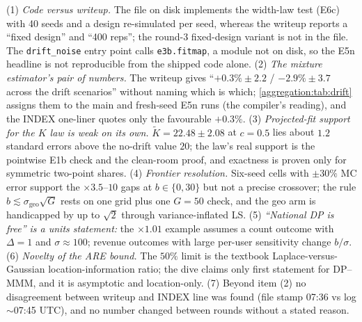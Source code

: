 \begin{reviewernote}[(compiler)]
(1) \emph{Code versus writeup.} The file on disk implements the width-law test (E6c) with 40 seeds and a design re-simulated per seed, whereas the writeup reports a ``fixed design'' and ``400 reps''; the round-3 fixed-design variant is not in the file. The \texttt{drift\_noise} entry point calls \texttt{e3b.fitmap}, a module not on disk, so the E5n headline is not reproducible from the shipped code alone. (2) \emph{The mixture estimator's pair of numbers.} The writeup gives ``$+0.3\% \pm 2.2$ / $-2.9\% \pm 3.7$ across the drift scenarios'' without naming which is which; \cref{aggregation:tab:drift} assigns them to the main and fresh-seed E5n runs (the compiler's reading), and the INDEX one-liner quotes only the favourable $+0.3\%$. (3) \emph{Projected-fit support for the $K$ law is weak on its own.} $\tilde K = 22.48 \pm 2.08$ at $c = 0.5$ lies about $1.2$ standard errors above the no-drift value $20$; the law's real support is the pointwise E1b check and the clean-room proof, and exactness is proven only for symmetric two-point shares. (4) \emph{Frontier resolution.} Six-seed cells with $\pm 30\%$ MC error support the $\times 3.5$--$10$ gaps at $b \in \{0, 30\}$ but not a precise crossover; the rule $b \lesssim \sigma_{\mathrm{geo}}\sqrt{G}$ rests on one grid plus one $G = 50$ check, and the geo arm is handicapped by up to $\sqrt2$ through variance-inflated LS. (5) \emph{``National DP is free'' is a units statement:} the $\times 1.01$ example assumes a count outcome with $\Delta = 1$ and $\sigma \approx 100$; revenue outcomes with large per-user sensitivity change $b/\sigma$. (6) \emph{Novelty of the ARE bound.} The $50\%$ limit is the textbook Laplace-versus-Gaussian location-information ratio; the dive claims only first statement for DP--MMM, and it is asymptotic and location-only. (7) Beyond item (2) no disagreement between writeup and INDEX line was found (file stamp 07:36 vs log $\sim$07:45 UTC), and no number changed between rounds without a stated reason.
\end{reviewernote}

